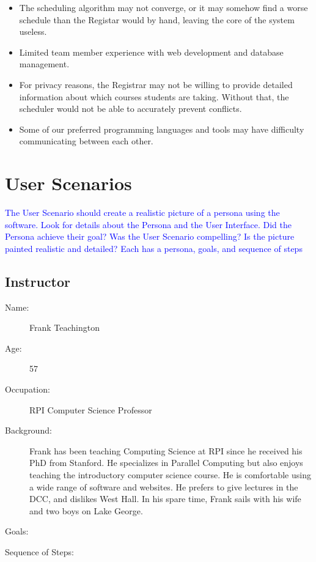 \documentclass[11pt]{article}
\begin{document}
\begin{itemize}
\item The scheduling algorithm may not converge, or it may somehow find a worse schedule than the Registar would by hand, leaving the core of the system useless.
\item Limited team member experience with web development and database management.
\item For privacy reasons, the Registrar may not be willing to provide detailed information about which courses students are taking. Without that, the scheduler would not be able to accurately prevent conflicts.
\item Some of our preferred programming languages and tools may have difficulty communicating between each other. %
\end{itemize}


\section{User Scenarios}  %
\textcolor{blue}{The User Scenario should create a realistic picture of a persona using the software.
Look for details about the Persona and the User Interface.
Did the Persona achieve their goal?
Was the User Scenario compelling?
Is the picture painted realistic and detailed?
Each has a persona, goals, and sequence of steps}
\subsection{Instructor} %
\begin{description}
\item[Name:] Frank Teachington
\item[Age:] 57
\item[Occupation:] RPI Computer Science Professor
\item[Background:] Frank has been teaching Computing Science at RPI since he received his PhD from Stanford. He specializes in Parallel Computing but also enjoys teaching the introductory computer science course. He is comfortable using a wide range of software and websites. He prefers to give lectures in the DCC, and dislikes West Hall.  In his spare time, Frank sails with his wife and two boys on Lake George.

\item[Goals:]
\begin{enumerate}
\end{enumerate}

\item[Sequence of Steps:]
\end{description}
\end{document}
